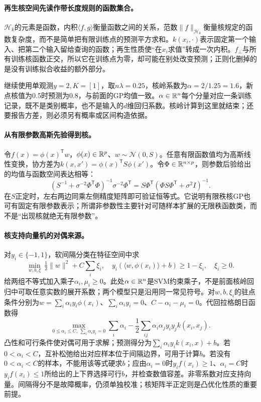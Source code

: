 \paragraph{再生核空间先读作带长度规则的函数集合。}
$\mathcal H_k$的元素是函数，内积$\langle f,g\rangle$衡量函数之间的关系，范数$\|f\|_{\mathcal H_k}$衡量核规定的函数复杂度，而不是简单把有限训练点的预测平方求和。$k(x_i,\cdot)$表示固定第一个输入、把第二个输入留给查询的函数；再生性质使“在$x_i$求值”转成一次内积。$f_\perp$与所有训练核函数正交，所以它在训练点为零，却可能在别处改变预测；正则化删掉的是没有训练拟合收益的额外部分。

继续使用单观测$y=2,K=[1]$，取$n\lambda=0.25$，核岭系数为$\alpha=2/1.25=1.6$，新点核值为0.5时预测为0.8，与前面的GP均值一致。$\alpha\in\mathbb{R}^n$每个分量对应一条训练记录，既不是类别概率，也不是输入的$d$维回归系数。核岭计算到这里就结束；还要报告方差，则必须另有概率或区间构造依据。

\paragraph{从有限参数高斯先验得到核。}
令$f(x)=\phi(x)^{\mathsf T}w$，$\phi(x)\in\mathbb{R}^p$、$w\sim\mathcal N(0,S)$。任意有限函数值均为高斯线性变换，协方差为$k(x,x')=\phi(x)^{\mathsf T}S\phi(x')$。令$\Phi\in\mathbb{R}^{n\times p}$，则参数后验给出的均值与函数空间表达相等：
\begin{equation}
 (S^{-1}+\sigma^{-2}\Phi^{\mathsf T}\Phi)^{-1}\sigma^{-2}\Phi^{\mathsf T}
 =S\Phi^{\mathsf T}(\Phi S\Phi^{\mathsf T}+\sigma^2I)^{-1}.
\end{equation}
在$S$正定时，左右两边同乘左侧精度矩阵即可验证恒等式。它说明有限秩核GP也可有固定有限参数表示；所谓非参数性主要针对可随样本扩展的无限秩函数类，而不是“出现核就绝无有限参数”。

\paragraph{核支持向量机的对偶来源。}
对$y_i\in\{-1,1\}$，软间隔分类在特征空间中求
\begin{equation}
 \min_{w,b,\xi}\ \tfrac12\|w\|^2+C\sum_i\xi_i,
 \quad y_i(\langle w,\phi(x_i)\rangle+b)\geq1-\xi_i,
 \quad\xi_i\geq0.
\end{equation}
给两组不等式加入乘子$\alpha_i,\mu_i\geq0$。此处$\alpha\in\mathbb{R}^n$是SVM约束乘子，不是前面核岭回归中可取任意实数的展开系数；两个模型只是沿用同一常见符号。对$w,b,\xi_i$的驻点条件分别为$w=\sum_i\alpha_iy_i\phi(x_i)$、$\sum_i\alpha_iy_i=0$、$C-\alpha_i-\mu_i=0$。代回拉格朗日函数得
\begin{equation}
 \max_{0\leq\alpha_i\leq C,\ \sum_i\alpha_iy_i=0}
 \sum_i\alpha_i-\frac12\sum_{ij}\alpha_i\alpha_jy_iy_jk(x_i,x_j).
\end{equation}
凸性和可行条件使对偶可用于求解；预测得分为$\sum_i\alpha_iy_ik(x_i,x)+b$。若$0<\alpha_i<C$，互补松弛给出对应样本位于间隔边界，可用于计算$b$。若没有$0<\alpha_i<C$的样本，不能用该等式硬求$b$；应由$\alpha_i=0$时$y_if(x_i)\geq1$、$\alpha_i=C$时$y_if(x_i)\leq1$所给出的上下界选择可行$b$，并检查数值容差。非零系数对应支持向量。间隔得分不是故障概率，仍须单独校准；核矩阵半正定则是凸优化性质的重要前提。

